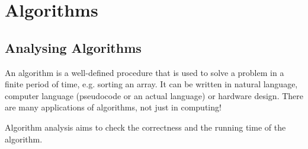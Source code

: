 \documentclass[a4paper, openany]{memoir}
\begin{document}
\chapter{Algorithms}

\section{Analysing Algorithms}
An algorithm is a well-defined procedure that is used to solve a problem in a finite period of time, e.g. sorting an array. It can be written in natural language, computer language (pseudocode or an actual language) or hardware design. There are many applications of algorithms, not just in computing!

\noindent Algorithm analysis aims to check the correctness and the running time of the algorithm.
\end{document}
